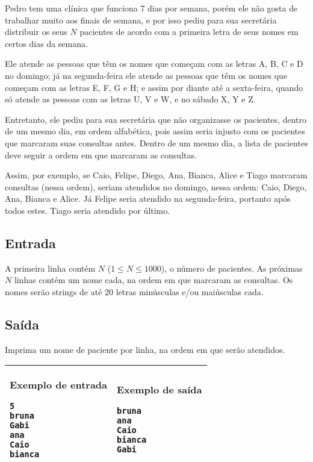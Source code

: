 Pedro tem uma clínica que funciona 7 dias por semana, porém ele não gosta
de trabalhar muito aos finais de semana, e por isso pediu para sua secretária
distribuir os seus $N$ pacientes de acordo com a primeira letra de seus nomes em
certos dias da semana.

Ele atende as pessoas que têm os nomes que começam
com as letras A, B, C e D no domingo; já na segunda-feira ele atende as pessoas que têm
os nomes que começam com as letras E, F, G e H; e assim por diante até
a sexta-feira, quando só atende as pessoas com as letras U, V e W, e no sábado X,
Y e Z.

Entretanto, ele pediu para sua secretária que não organizasse os pacientes,
    dentro de um mesmo dia, em ordem
alfabética, pois assim seria injusto com os pacientes que marcaram suas consultas
antes. Dentro de um mesmo dia, a lista de pacientes deve seguir a ordem em que
marcaram as consultas.

Assim, por exemplo, se Caio, Felipe, Diego,
Ana, Bianca, Alice e Tiago marcaram consultas (nessa ordem),
seriam atendidos no domingo, nessa ordem: Caio, Diego, Ana, Bianca e Alice. 
Já Felipe seria atendido na segunda-feira, portanto após todos estes. Tiago
seria atendido por último.

\subsection*{Entrada}

A primeira linha contém $N$ ($1 \leq N \leq 1000$), o número de pacientes. As
próximas $N$ linhas contém um nome cada, na ordem em que marcaram as consultas.
Os nomes serão strings de até 20 letras minúsculas e/ou maiúsculas cada.

\subsection*{Saída}

Imprima um nome de paciente por linha, na ordem em que serão atendidos.

\begin{table}[!h]
\centering
\begin{tabular}{|l|l|}
\hline
\begin{minipage}[t]{3in}
\textbf{Exemplo de entrada}
\begin{verbatim}
5
bruna
Gabi
ana
Caio
bianca
\end{verbatim}
\vspace{1mm}
\end{minipage}
&
\begin{minipage}[t]{3in}
\textbf{Exemplo de saída}
\begin{verbatim}
bruna
ana
Caio
bianca
Gabi
\end{verbatim}
\vspace{1mm}
\end{minipage} \\
\hline
\end{tabular}
\end{table}
